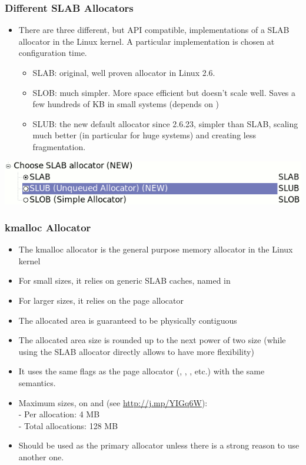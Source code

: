 \begin{frame}
  \frametitle{Different SLAB Allocators}
  \begin{itemize}
  \item There are three different, but API compatible, implementations of
    a SLAB allocator in the Linux kernel. A particular implementation
    is chosen at configuration time.
    \begin{itemize}
    \item SLAB: original, well proven allocator in Linux 2.6.
    \item SLOB: much simpler. More space efficient but doesn't scale
      well. Saves a few hundreds of KB in small systems (depends on
      )
    \item SLUB: the new default allocator since 2.6.23, simpler than
      SLAB, scaling much better (in particular for huge systems) and
      creating less fragmentation.
    \end{itemize}
  \end{itemize}
  \begin{center}
    \includegraphics[width=\textwidth]{slides/kernel-driver-development-memory/slab-screenshot.png}
  \end{center}
\end{frame}

\begin{frame}
  \frametitle{kmalloc Allocator}
  \begin{itemize}
  \item The kmalloc allocator is the general purpose memory allocator
    in the Linux kernel
  \item For small sizes, it relies on generic SLAB caches, named
     in 
  \item For larger sizes, it relies on the page allocator
  \item The allocated area is guaranteed to be physically contiguous
  \item The allocated area size is rounded up to the next power of two
    size (while using the SLAB allocator directly allows to have more
    flexibility)
  \item It uses the same flags as the page allocator (,
    , , etc.) with the same semantics.
  \item Maximum sizes, on  and  (see
    \url{http://j.mp/YIGq6W}): \\
    - Per allocation: 4 MB \\
    - Total allocations: 128 MB
  \item Should be used as the primary allocator unless there is a
    strong reason to use another one.
  \end{itemize}
\end{frame}


